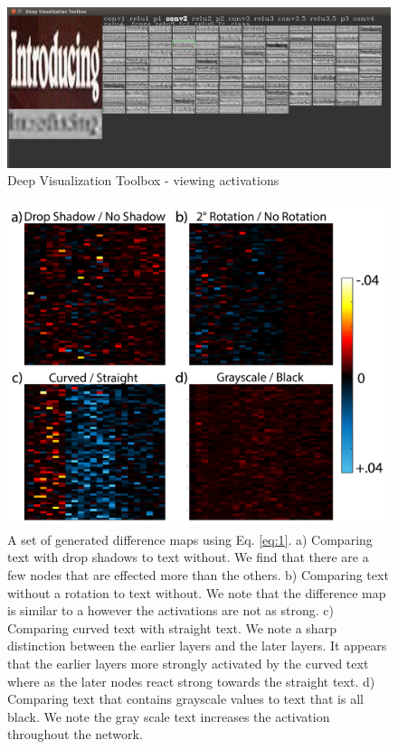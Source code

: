\documentclass[10pt,twocolumn,letterpaper]{article}
\begin{document}
\begin{figure}
\includegraphics[width=\columnwidth]{Figures/deepvis/deepvis-conv2.png}
\caption{Deep Visualization Toolbox - viewing activations}
\label{fig:deepvis}
\end{figure}

\begin{figure}
\includegraphics[width=\columnwidth]{Figures/diff_examples/diff_examples-01.png}
\caption{A set of generated difference maps using Eq. \ref{eq:1}. a) Comparing text with drop shadows to text without. We find that there are a few nodes that are effected more than the others. b) Comparing text without a rotation to text without. We note that the difference map is similar to a however the activations are not as strong. c) Comparing curved text with straight text. We note a sharp distinction between the earlier layers and the later layers. It appears that the earlier layers more strongly activated by the curved text where as the later nodes react strong towards the straight text. d) Comparing text that contains grayscale values to text that is all black. We note the gray scale text increases the activation throughout the network.}
\label{fig:diffexamples}
\end{figure}
\end{document}
